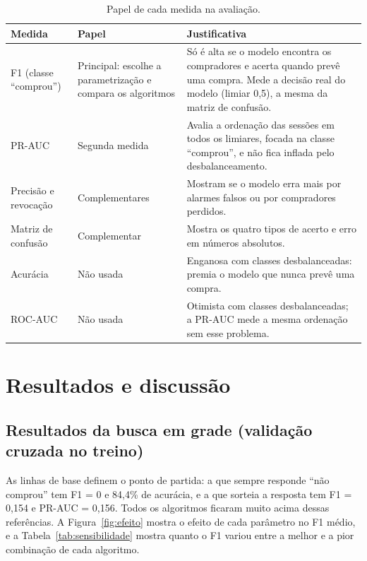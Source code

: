 \documentclass[11pt,a4paper]{article}
\begin{document}
\begin{table}[H]
  \centering\small
  \caption{Papel de cada medida na avaliação.}
  \label{tab:medidas}
  \begin{tabularx}{\textwidth}{>{\raggedright\arraybackslash}p{3.2cm}>{\raggedright\arraybackslash}p{3.6cm}Y}
    \toprule
    Medida & Papel & Justificativa\\
    \midrule
    F1 (classe ``comprou'') & Principal: escolhe a parametrização e compara os algoritmos & Só é alta se o modelo
      encontra os compradores e acerta quando prevê uma compra. Mede a decisão real do modelo (limiar 0,5), a mesma da
      matriz de confusão.\\
    PR-AUC & Segunda medida & Avalia a ordenação das sessões em todos os limiares, focada na classe ``comprou'', e não
      fica inflada pelo desbalanceamento.\\
    Precisão e revocação & Complementares & Mostram se o modelo erra mais por alarmes falsos ou por compradores
      perdidos.\\
    Matriz de confusão & Complementar & Mostra os quatro tipos de acerto e erro em números absolutos.\\
    Acurácia & Não usada & Enganosa com classes desbalanceadas: premia o modelo que nunca prevê uma compra.\\
    ROC-AUC & Não usada & Otimista com classes desbalanceadas; a PR-AUC mede a mesma ordenação sem esse problema.\\
    \bottomrule
  \end{tabularx}
\end{table}

\section{Resultados e discussão}

\subsection{Resultados da busca em grade (validação cruzada no treino)}\label{sec:resultados_grade}

As linhas de base definem o ponto de partida: a que sempre responde ``não comprou'' tem F1 = 0 e 84,4\% de acurácia, e
a que sorteia a resposta tem F1 = 0,154 e PR-AUC = 0,156. Todos os algoritmos ficaram muito acima dessas referências.
A Figura~\ref{fig:efeito} mostra o efeito de cada parâmetro no F1 médio, e a Tabela~\ref{tab:sensibilidade} mostra
quanto o F1 variou entre a melhor e a pior combinação de cada algoritmo.
\end{document}
